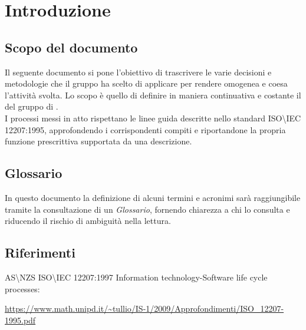 \chapter{Introduzione}

\section{Scopo del documento}
Il seguente documento si pone l'obiettivo di trascrivere le varie decisioni e metodologie che il gruppo ha scelto di applicare per rendere omogenea e coesa l'attività svolta. Lo scopo è quello di definire in maniera continuativa e costante il  del gruppo di .\\
I processi messi in atto rispettano le linee guida descritte nello standard ISO\textbackslash IEC 12207:1995, approfondendo i corrispondenti compiti e riportandone la propria funzione prescrittiva supportata da una descrizione.

\section{Glossario}
In questo documento la definizione di alcuni termini e acronimi sarà raggiungibile tramite la consultazione di un \textit{Glossario}, fornendo chiarezza a chi lo consulta e riducendo il rischio di ambiguità nella lettura.

\section{Riferimenti}
AS\textbackslash NZS ISO\textbackslash IEC 12207:1997 Information technology-Software life cycle processes:\\
\begin{footnotesize}
    \url{https://www.math.unipd.it/~tullio/IS-1/2009/Approfondimenti/ISO_12207-1995.pdf}
\end{footnotesize}
